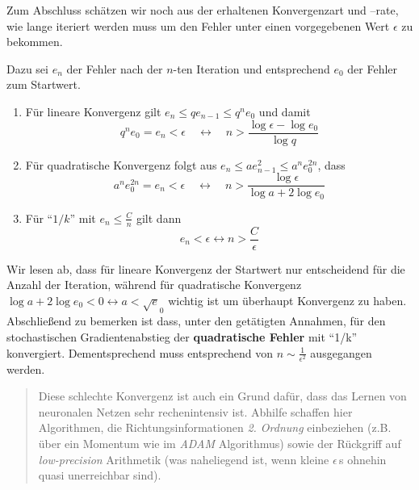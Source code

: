 \documentclass[
]{book}
\newenvironment {JHSAYS} [0] {\begin{quote}\color{jhsc}} {\end{quote}}
\theoremstyle{definition}
\theoremstyle{definition}
\theoremstyle{definition}
\theoremstyle{definition}
\theoremstyle{remark}
\begin{document}
Zum Abschluss schätzen wir noch aus der erhaltenen Konvergenzart und --rate,
wie lange iteriert werden muss um den Fehler unter einen vorgegebenen Wert
\(\epsilon\) zu bekommen.

Dazu sei \(e_{n}\) der Fehler nach der \(n\)-ten Iteration und entsprechend \(e_0\) der
Fehler zum Startwert.

\begin{enumerate}
\def\labelenumi{\arabic{enumi}.}
\item
  Für lineare Konvergenz gilt \(e_n \leq qe_{n-1} \leq q^n e_0\) und damit
  \begin{equation*}
  q^n e_0 = e_n< \epsilon \quad \leftrightarrow \quad n > \frac{\log \epsilon -
  \log e_0}{\log q}
  \end{equation*}
\item
  Für quadratische Konvergenz folgt aus \(e_n \leq ae_{n-1}^2 \leq a^n e_0^{2n}\), dass
  \begin{equation*}
  a^n e_0^{2n} = e_n< \epsilon \quad \leftrightarrow \quad n > \frac{\log \epsilon}{\log a + 2\log e_0}
  \end{equation*}
\item
  Für ``\(1/k\)'' mit \(e_n\leq \frac {C}{n}\) gilt dann
  \begin{equation*}
  e_n < \epsilon \leftrightarrow n > \frac{C}{\epsilon}
  \end{equation*}
\end{enumerate}

Wir lesen ab, dass für lineare Konvergenz der Startwert nur entscheidend
für die Anzahl der Iteration, während für quadratische Konvergenz
\(\log a + 2 \log e_0 < 0 \leftrightarrow a < \sqrt e_0\) wichtig ist um
überhaupt Konvergenz zu haben. Abschließend zu bemerken ist dass,
unter den getätigten Annahmen, für den stochastischen Gradientenabstieg der \textbf{quadratische Fehler} mit ``1/k'' konvergiert. Dementsprechend muss entsprechend von \(n\sim \frac{1}{\epsilon^2}\) ausgegangen werden.

\leavevmode\hypertarget{rem-bad-conv-sdg}{}%
\begin{JHSAYS}
Diese schlechte Konvergenz ist auch ein Grund dafür, dass das Lernen von
neuronalen Netzen sehr rechenintensiv ist. Abhilfe schaffen hier Algorithmen,
die Richtungsinformationen \emph{2. Ordnung} einbeziehen (z.B. über ein Momentum
wie im \emph{ADAM} Algorithmus) sowie der Rückgriff auf \emph{low-precision}
Arithmetik (was naheliegend ist, wenn kleine \(\epsilon\,\)s ohnehin quasi unerreichbar
sind).

\end{JHSAYS}
\end{document}
